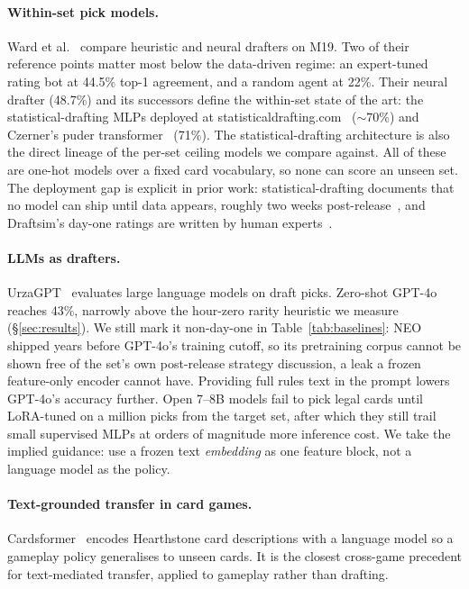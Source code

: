 \paragraph{Within-set pick models.}
Ward et al.~\citep{ward2021drafting} compare heuristic and neural drafters
on M19. Two of their reference points matter most below the data-driven
regime: an expert-tuned rating bot at 44.5\% top-1 agreement, and a random
agent at 22\%. Their neural drafter (48.7\%) and its successors define the
within-set state of the art: the statistical-drafting MLPs deployed at
statisticaldrafting.com~\citep{brooks2024statistical} (${\sim}70\%$) and
Czerner's puder transformer~\citep{czerner2025puder} (71\%). The
statistical-drafting architecture is also the direct lineage of the
per-set ceiling models we compare against. All of these are one-hot models
over a fixed card vocabulary, so none can score an unseen set. The
deployment gap is explicit in prior work: statistical-drafting documents
that no model can ship until \seventeenlands{} data appears, roughly two
weeks post-release~\citep{brooks2024statistical}, and Draftsim's day-one
ratings are written by human experts~\citep{draftsimratings}.

\paragraph{LLMs as drafters.}
UrzaGPT~\citep{bertram2025urzagpt} evaluates large language models on draft
picks. Zero-shot GPT-4o reaches 43\%, narrowly above the hour-zero rarity
heuristic we measure (\S\ref{sec:results}). We still mark it non-day-one
in Table~\ref{tab:baselines}: NEO shipped years before GPT-4o's training
cutoff, so its pretraining corpus cannot be shown free of the set's own
post-release strategy discussion, a leak a frozen feature-only encoder
cannot have. Providing full rules text in the prompt lowers GPT-4o's
accuracy further. Open 7--8B models fail to pick legal cards until
LoRA-tuned on a million picks from the target set, after which they still
trail small supervised MLPs at orders of magnitude more inference cost. We
take the implied guidance: use a frozen text \emph{embedding} as one
feature block, not a language model as the policy.

\paragraph{Text-grounded transfer in card games.}
Cardsformer~\citep{xia2023cardsformer} encodes Hearthstone card
descriptions with a language model so a gameplay policy generalises to
unseen cards. It is the closest cross-game precedent for text-mediated
transfer, applied to gameplay rather than drafting.
